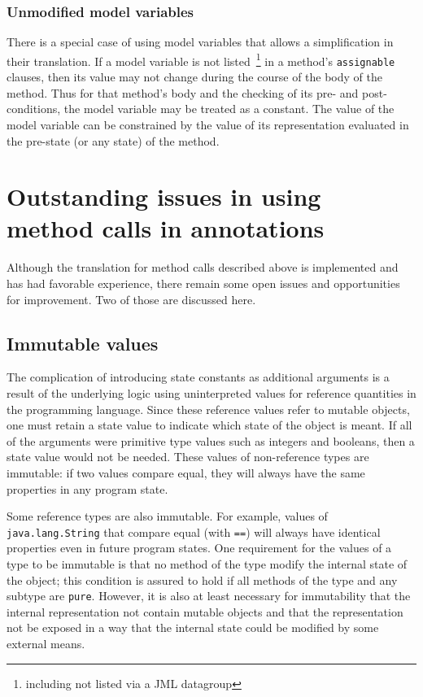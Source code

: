 \documentclass{sig-alternate}
\begin{document}
\subsubsection{Unmodified model variables}

There is a special case of using model variables that allows a simplification in their translation.
If a model variable is not listed~\footnote{including not listed via a JML datagroup} in a
method's \texttt{assignable} clauses, then its value may not change during the course of the
body of the method.  Thus for that method's body and the checking of its pre- and
post-conditions, the model variable may be treated as a constant.  The value of the model 
variable can be constrained by the value of its representation evaluated in the pre-state
(or any state) of the method.

\section{Outstanding issues in using \\ method calls in annotations}

Although the translation for method calls described above is implemented 
and has had favorable experience, there remain some open issues and opportunities 
for improvement.  Two of those are discussed here.

\subsection{Immutable values}

The complication of introducing state constants as additional arguments is a result of the underlying logic using uninterpreted values for reference quantities in the programming language.
Since these reference values refer to mutable objects, one must retain a state value to 
indicate which state of the object is meant.  If all of the arguments were primitive type values
such as integers and booleans, then a state value would not be needed.  These values of
non-reference types are immutable: if two values compare equal, they will always have the same
properties in any program state. 

Some reference types are also immutable.  For example, values of \texttt{java.lang.String} that
compare equal (with \texttt{==}) will always have identical properties even in future program
states.  One requirement for the values of a type to be immutable is that no method of the type
modify the internal state of the object; this condition is assured to hold if all methods of the 
type and any subtype are
\texttt{pure}.  However, it is also at least
necessary for immutability
that the internal representation not contain mutable objects and
that the representation not be exposed  in a way that the internal state could be modified by 
some external means.
\end{document}
